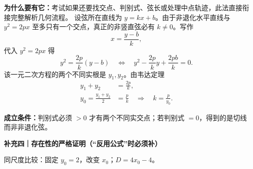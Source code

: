 \begin{proofbox}
\par\noindent\textbf{为什么要有它：}考试如果还要找交点、判别式、弦长或处理中点轨迹，此法直接衔接完整解析几何流程。
设弦所在直线为 $y=kx+b$。由于非退化水平直线与 $y^2=2px$ 至多只有一个交点，真正的非竖直弦必有 $k\ne0$。写作
\[x=\frac{y-b}{k},\]
代入 $y^2=2px$ 得
\[
 y^2=\frac{2p}{k}(y-b)
 \quad\Longleftrightarrow\quad
 y^2-\frac{2p}{k}y+\frac{2pb}{k}=0.
\]
该一元二次方程的两个不同实根是 $y_1,y_2$。由韦达定理
\[
 \begin{aligned}
 y_1+y_2&=\frac{2p}{k},\\
 y_0=\frac{y_1+y_2}{2}&=\frac{p}{k}
 \quad\Longrightarrow\quad\boxed{k=\frac{p}{y_0}}.
 \end{aligned}
\]
\par\noindent\textbf{成立条件：}判别式必须 $>0$ 才有两个不同实交点；若判别式 $=0$，得到的是切线而非非退化弦。
\par\medskip
\begin{minipage}{\linewidth}
\par\medskip
\begin{minipage}{\linewidth}
\noindent
\textbf{\textcolor{CProof}{补充四｜存在性的严格证明（“反用公式”时必须补）}}\par\nobreak\smallskip
\par
\begin{minipage}{\linewidth}
\begin{center}

\par\small 同尺度比较：固定 $y_0=2$，改变 $x_0$；$D=4x_0-4$。
\end{center}
\end{minipage}\par
\end{minipage}
\par

\par

\end{minipage}



\end{proofbox}
